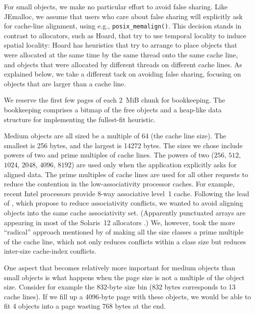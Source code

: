 \documentclass[pldi]{sigplanconf-pldi15}
\newcommand{\code}[1]{\texttt{#1}}
\begin{document}
For small objects, we make no particular effort to avoid false
sharing.  Like JEmalloc, we assume that users who care about false
sharing will explicitly ask for cache-line alignment, using e.g.,
\code{posix_memalign()}.  This decision stands in contrast to
allocators, such as Hoard, that try to use temporal locality to induce
spatial locality: Hoard has heuristics that try to arrange to place
objects that were allocated at the same time by the same thread onto
the same cache line, and objects that were allocated by different
threads on different cache lines.  As explained below, we take a
different tack on avoiding false sharing, focusing on objects that are
larger than a cache line.

We reserve the first few pages of each 2~MiB chunk for bookkeeping.
The bookkeeping comprises a bitmap of the free objects and a heap-like
data structure for implementing the fullest-fit
heuristic. 



Medium objects are all sized be a multiple of 64 (the cache line
size).  The smallest is 256 bytes, and the largest is 14272 bytes.
The sizes we chose include powers of two and prime multiples of cache
lines.  The powers of two ($256$, $512$, $1024$, $2048$, $4096$,
$8192$) are used only when the application explicitly asks for aligned
data.  The prime multiples of cache lines are used for all other
requests to reduce the contention in the low-associativity processor
caches. For example, recent Intel processors provide 8-way associative
level~1 cache.  Following the lead of \cite{AfekDiMo11}, which propose
 to reduce associativity conflicts, we wanted
to avoid aligning objects into the same cache associativity
set. (Apparently punctuated arrays are appearing in most of the
Solaris~12 allocators \cite{Dice14b}.)  We, however, took the more
``radical'' approach mentioned by \cite{Dice14a} of making all the
size classes a prime multiple of the cache line, which not only
reduces conflicts within a class size but reduces inter-size
cache-index conflicts.

One aspect that becomes relatively more important for medium objects
than small objects is what happens when the page size is not a
multiple of the object size.  Consider for example the 832-byte size
bin (832 bytes corresponds to 13 cache lines).  If we fill up a
4096-byte page with these objects, we would be able to fit 4 objects
into a page wasting 768 bytes at the end.  
\end{document}
